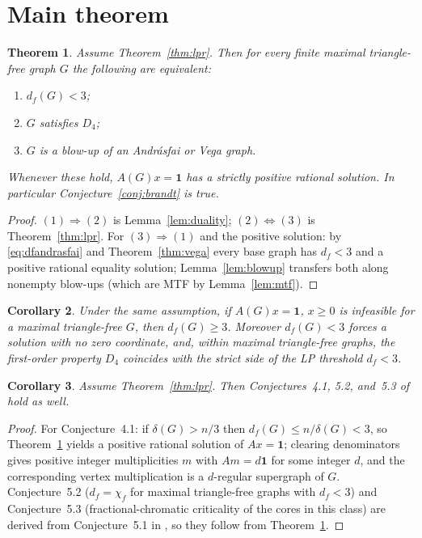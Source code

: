 \documentclass[11pt]{article}
\newtheorem{theorem}{Theorem}[section]
\newtheorem{corollary}[theorem]{Corollary}
\theoremstyle{definition}
\theoremstyle{remark}
\newcommand{\df}{d_f}
\newcommand{\ones}{\mathbf 1}
\begin{document}
\section{Main theorem}

\begin{theorem}\label{thm:main}
Assume Theorem~\ref{thm:lpr}. Then for every finite maximal triangle-free graph $G$ the
following are equivalent:
\begin{enumerate}
\item $\df(G)<3$;
\item $G$ satisfies $D_4$;
\item $G$ is a blow-up of an Andr\'asfai or Vega graph.
\end{enumerate}
Whenever these hold, $A(G)x=\ones$ has a strictly positive rational solution. In particular
Conjecture~\ref{conj:brandt} is true.
\end{theorem}

\begin{proof}
$(1)\Rightarrow(2)$ is Lemma~\ref{lem:duality}; $(2)\Leftrightarrow(3)$ is
Theorem~\ref{thm:lpr}. For $(3)\Rightarrow(1)$ and the positive solution: by
\eqref{eq:dfandrasfai} and Theorem~\ref{thm:vega} every base graph has $\df<3$ and a
positive rational equality solution; Lemma~\ref{lem:blowup} transfers both along nonempty
blow-ups (which are MTF by Lemma~\ref{lem:mtf}).
\end{proof}

\begin{corollary}
Under the same assumption, if $A(G)x=\ones$, $x\ge0$ is infeasible for a maximal
triangle-free $G$, then $\df(G)\ge3$. Moreover $\df(G)<3$ forces a solution with no zero
coordinate, and, within maximal triangle-free graphs, the first-order property $D_4$
coincides with the strict side of the LP threshold $\df<3$.
\end{corollary}

\begin{corollary}\label{cor:brandtothers}
Assume Theorem~\ref{thm:lpr}. Then Conjectures~4.1, 5.2, and~5.3 of \cite{Brandt2002}
hold as well.
\end{corollary}

\begin{proof}
For Conjecture~4.1: if $\delta(G)>n/3$ then $\df(G)\le n/\delta(G)<3$, so
Theorem~\ref{thm:main} yields a positive rational solution of $Ax=\ones$; clearing
denominators gives positive integer multiplicities $m$ with $Am=d\ones$ for some integer
$d$, and the corresponding vertex multiplication is a $d$-regular supergraph of $G$.
Conjecture~5.2 ($\df=\chi_f$ for maximal triangle-free graphs with $\df<3$) and
Conjecture~5.3 (fractional-chromatic criticality of the cores in this class) are derived
from Conjecture~5.1 in \cite[Section~5]{Brandt2002}, so they follow from
Theorem~\ref{thm:main}.
\end{proof}
\end{document}
